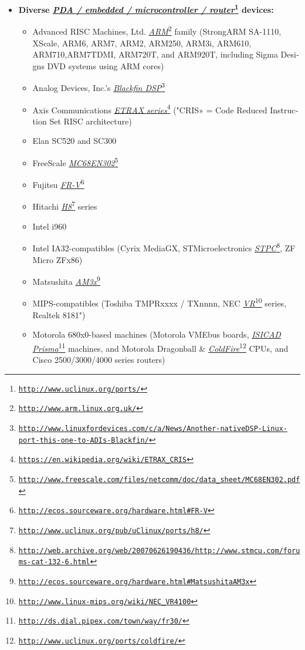 \begin{latin}
\begin{itemize}
	\item {\bfseries Diverse \emph{\url{PDA / embedded / microcontroller / router}}\footnote{\texttt{\url{http://www.uclinux.org/ports/}}} devices:}
	\begin{itemize}
		\item Advanced RISC Machines, Ltd. \emph{\url{ARM}}\footnote{\texttt{\url{http://www.arm.linux.org.uk/}}} family (StrongARM SA-1110, XScale, ARM6, ARM7, ARM2, ARM250, ARM3i, ARM610, ARM710,ARM7TDMI, ARM720T, and ARM920T, including Sigma Designs DVD systems using ARM cores)
		\item Analog Devices, Inc.'s \emph{\url{Blackfin DSP}}\footnote{\texttt{\url{http://www.linuxfordevices.com/c/a/News/Another-nativeDSP-Linux-port-this-one-to-ADIs-Blackfin/}}}
		\item Axis Communications \emph{\url{ETRAX series}}\footnote{\texttt{\url{https://en.wikipedia.org/wiki/ETRAX_CRIS}}}
			("CRIS» = Code Reduced Instruction Set RISC architecture)
		\item Elan SC520 and SC300
		\item FreeScale \emph{\url{MC68EN302}}\footnote{\texttt{\url{http://www.freescale.com/files/netcomm/doc/data_sheet/MC68EN302.pdf}}}
		\item Fujitsu \emph{\url{FR-V}}\footnote{\texttt{\url{http://ecos.sourceware.org/hardware.html#FR-V}}}
		\item Hitachi \emph{\url{H8}}\footnote{\texttt{\url{http://www.uclinux.org/pub/uClinux/ports/h8/}}} series
		\item Intel i960
		\item Intel IA32-compatibles (Cyrix MediaGX, STMicroelectronics \emph{\url{STPC}}\footnote{\texttt{\url{http://web.archive.org/web/20070626190436/http://www.stmcu.com/forums-cat-132-6.html}}}, ZF Micro ZFx86)
		\item Matsushita \emph{\url{AM3x}}\footnote{\texttt{\url{http://ecos.sourceware.org/hardware.html#MatsushitaAM3x}}}
		\item MIPS-compatibles (Toshiba TMPRxxxx / TXnnnn, NEC \emph{\url{VR}}\footnote{\texttt{\url{http://www.linux-mips.org/wiki/NEC_VR4100}}} series, Realtek 8181")
		\item Motorola 680x0-based machines (Motorola VMEbus boards, 
			\emph{\url{ISICAD Prisma}}\footnote{\texttt{\url{http://ds.dial.pipex.com/town/way/fr30/}}} machines, and Motorola Dragonball \& 
			\emph{\url{ColdFire}}\footnote{\texttt{\url{http://www.uclinux.org/ports/coldfire/}}} CPUs, and Cisco 2500/3000/4000 series routers)

\end{itemize}
\end{itemize}
\end{latin}
